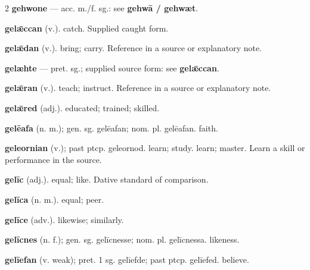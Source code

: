 \begin{multicols*}{2}
\textbf{gehwone} — acc. m./f. sg.: see \textbf{gehwā / gehwæt}.\par
\textbf{gelǣccan} (v.). catch. Supplied caught form.\par
\textbf{gelǣdan} (v.). bring; carry. Reference in a source or explanatory note.\par
\textbf{gelæhte} — pret. sg.; supplied source form: see \textbf{gelǣccan}.\par
\textbf{gelǣran} (v.). teach; instruct. Reference in a source or explanatory note.\par
\textbf{gelǣred} (adj.). educated; trained; skilled.\par
\textbf{gelēafa} (n. m.); gen. sg. gelēafan; nom. pl. gelēafan. faith.\par
\textbf{geleornian} (v.); past ptcp. geleornod. learn; study. learn; master. Learn a skill or performance in the source.\par
\textbf{gelīc} (adj.). equal; like. Dative standard of comparison.\par
\textbf{gelīca} (n. m.). equal; peer.\par
\textbf{gelīce} (adv.). likewise; similarly.\par
\textbf{gelīcnes} (n. f.); gen. sg. gelīcnesse; nom. pl. gelīcnessa. likeness.\par
\textbf{gelīefan} (v. weak); pret. 1 sg. gelīefde; past ptcp. gelīefed. believe.\par

\end{multicols*}
